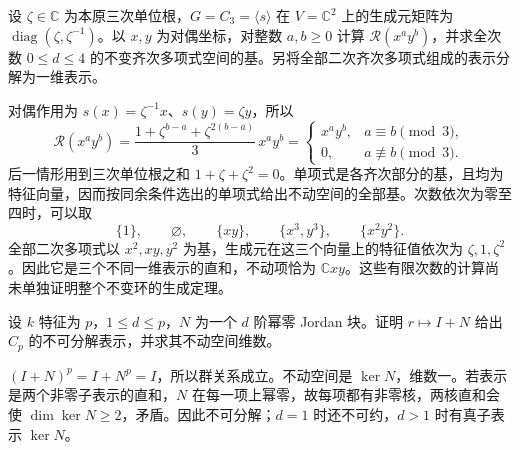 \begin{exercise}\label{b5:ex:01-polynomial-average}
	设 \(\zeta\in\mathbb C\) 为本原三次单位根，\(G=C_3=\langle s\rangle\) 在 \(V=\mathbb C^2\) 上的生成元矩阵为 \(\operatorname{diag}(\zeta,\zeta^{-1})\)。以 \(x,y\) 为对偶坐标，对整数 \(a,b\ge0\) 计算 \(\mathcal R(x^ay^b)\)，并求全次数 \(0\le d\le4\) 的不变齐次多项式空间的基。另将全部二次齐次多项式组成的表示分解为一维表示。
\end{exercise}
\begin{solution}
	对偶作用为 \(s(x)=\zeta^{-1}x\)、\(s(y)=\zeta y\)，所以
	\[
		\mathcal R(x^ay^b)= \frac{1+\zeta^{b-a}+\zeta^{2(b-a)}}3\,x^ay^b =
		\begin{cases}
			x^ay^b,&a\equiv b\pmod3,\\
			0,&a\not\equiv b\pmod3.
		\end{cases}
	\]
	后一情形用到三次单位根之和 \(1+\zeta+\zeta^2=0\)。单项式是各齐次部分的基，且均为特征向量，因而按同余条件选出的单项式给出不动空间的全部基。次数依次为零至四时，可以取
	\[
		\{1\},\qquad \varnothing,\qquad \{xy\},\qquad \{x^3,y^3\},\qquad \{x^2y^2\}.
	\]
	全部二次多项式以 \(x^2,xy,y^2\) 为基，生成元在这三个向量上的特征值依次为 \(\zeta,1,\zeta^2\)。因此它是三个不同一维表示的直和，不动项恰为 \(\mathbb Cxy\)。这些有限次数的计算尚未单独证明整个不变环的生成定理。
\end{solution}

\begin{exercise}\label{b5:ex:01-cyclic-unipotent}
	设 \(k\) 特征为 \(p\)，\(1\le d\le p\)，\(N\) 为一个 \(d\) 阶幂零 Jordan 块。证明 \(r\mapsto I+N\) 给出 \(C_p\) 的不可分解表示，并求其不动空间维数。
\end{exercise}
\begin{solution}
	\((I+N)^p=I+N^p=I\)，所以群关系成立。不动空间是 \(\ker N\)，维数一。若表示是两个非零子表示的直和，\(N\) 在每一项上幂零，故每项都有非零核，两核直和会使 \(\dim\ker N\ge2\)，矛盾。因此不可分解；\(d=1\) 时还不可约，\(d>1\) 时有真子表示 \(\ker N\)。
\end{solution}
